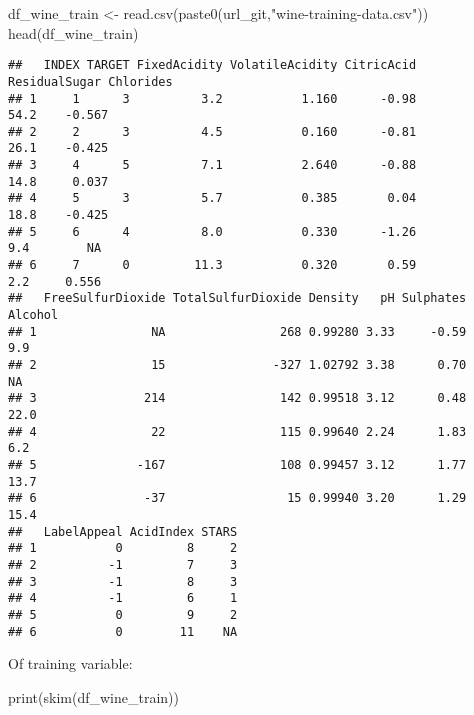 \documentclass[
]{article}
\newenvironment{Shaded}{\begin{snugshade}}{\end{snugshade}}
\newcommand{\FunctionTok}[1]{\textcolor[rgb]{0.00,0.00,0.00}{#1}}
\newcommand{\NormalTok}[1]{#1}
\newcommand{\OtherTok}[1]{\textcolor[rgb]{0.56,0.35,0.01}{#1}}
\newcommand{\StringTok}[1]{\textcolor[rgb]{0.31,0.60,0.02}{#1}}
\begin{document}
\begin{Shaded}
\begin{Highlighting}[]
\NormalTok{df\_wine\_train }\OtherTok{\textless{}{-}} 
  \FunctionTok{read.csv}\NormalTok{(}\FunctionTok{paste0}\NormalTok{(url\_git,}\StringTok{"wine{-}training{-}data.csv"}\NormalTok{))}
\FunctionTok{head}\NormalTok{(df\_wine\_train)}
\end{Highlighting}
\end{Shaded}

\begin{verbatim}
##   INDEX TARGET FixedAcidity VolatileAcidity CitricAcid ResidualSugar Chlorides
## 1     1      3          3.2           1.160      -0.98          54.2    -0.567
## 2     2      3          4.5           0.160      -0.81          26.1    -0.425
## 3     4      5          7.1           2.640      -0.88          14.8     0.037
## 4     5      3          5.7           0.385       0.04          18.8    -0.425
## 5     6      4          8.0           0.330      -1.26           9.4        NA
## 6     7      0         11.3           0.320       0.59           2.2     0.556
##   FreeSulfurDioxide TotalSulfurDioxide Density   pH Sulphates Alcohol
## 1                NA                268 0.99280 3.33     -0.59     9.9
## 2                15               -327 1.02792 3.38      0.70      NA
## 3               214                142 0.99518 3.12      0.48    22.0
## 4                22                115 0.99640 2.24      1.83     6.2
## 5              -167                108 0.99457 3.12      1.77    13.7
## 6               -37                 15 0.99940 3.20      1.29    15.4
##   LabelAppeal AcidIndex STARS
## 1           0         8     2
## 2          -1         7     3
## 3          -1         8     3
## 4          -1         6     1
## 5           0         9     2
## 6           0        11    NA
\end{verbatim}

Of training variable:

\begin{Shaded}
\begin{Highlighting}[]
\FunctionTok{print}\NormalTok{(}\FunctionTok{skim}\NormalTok{(df\_wine\_train))}
\end{Highlighting}
\end{Shaded}
\end{document}
